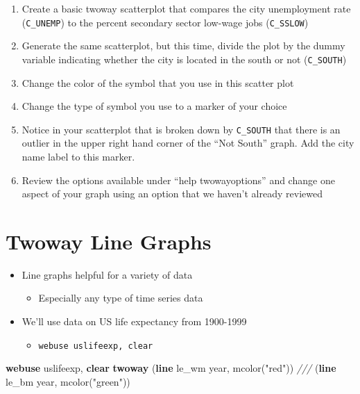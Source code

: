 \documentclass[]{book}
\newenvironment{Shaded}{\begin{snugshade}}{\end{snugshade}}
\newcommand{\CommentTok}[1]{\textcolor[rgb]{0.56,0.35,0.01}{\textit{#1}}}
\newcommand{\FunctionTok}[1]{\textcolor[rgb]{0.00,0.00,0.00}{#1}}
\newcommand{\KeywordTok}[1]{\textcolor[rgb]{0.13,0.29,0.53}{\textbf{#1}}}
\newcommand{\NormalTok}[1]{#1}
\newcommand{\StringTok}[1]{\textcolor[rgb]{0.31,0.60,0.02}{#1}}
\providecommand{\tightlist}{%
  \setlength{\itemsep}{0pt}\setlength{\parskip}{0pt}}
\begin{document}
\begin{enumerate}
\def\labelenumi{\arabic{enumi}.}
\tightlist
\item
  Create a basic twoway scatterplot that compares the city unemployment rate (\texttt{C\_UNEMP}) to the percent secondary sector low-wage jobs (\texttt{C\_SSLOW})
\item
  Generate the same scatterplot, but this time, divide the plot by the dummy variable indicating whether the city is located in the south or not (\texttt{C\_SOUTH})
\item
  Change the color of the symbol that you use in this scatter plot
\item
  Change the type of symbol you use to a marker of your choice
\item
  Notice in your scatterplot that is broken down by \texttt{C\_SOUTH} that there is an outlier in the upper right hand corner of the ``Not South'' graph. Add the city name label to this marker.
\item
  Review the options available under ``help twowayoptions'' and change one aspect of your graph using an option that we haven't already reviewed
\end{enumerate}

\hypertarget{twoway-line-graphs}{%
\section{Twoway Line Graphs}\label{twoway-line-graphs}}

\begin{itemize}
\tightlist
\item
  Line graphs helpful for a variety of data

  \begin{itemize}
  \tightlist
  \item
    Especially any type of time series data
  \end{itemize}
\item
  We'll use data on US life expectancy from 1900-1999

  \begin{itemize}
  \tightlist
  \item
    \texttt{webuse\ uslifeexp,\ clear}
  \end{itemize}
\end{itemize}

\begin{Shaded}
\begin{Highlighting}[]
  \KeywordTok{webuse}\NormalTok{ uslifeexp, }\KeywordTok{clear}
  \KeywordTok{twoway}\NormalTok{ (}\KeywordTok{line}\NormalTok{ le_wm }\FunctionTok{year}\NormalTok{, mcolor(}\StringTok{"red"}\NormalTok{)) }\CommentTok{///}
\NormalTok{      (}\KeywordTok{line}\NormalTok{ le_bm }\FunctionTok{year}\NormalTok{, mcolor(}\StringTok{"green"}\NormalTok{))}
\end{Highlighting}
\end{Shaded}
\end{document}
